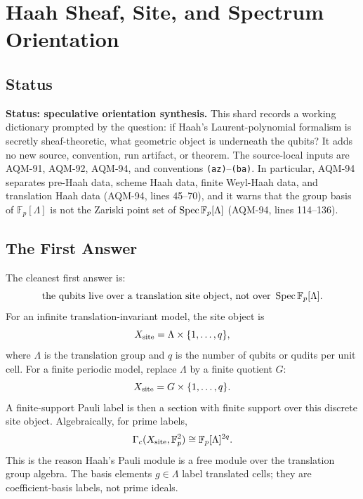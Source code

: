 
\section{Haah Sheaf, Site, and Spectrum Orientation}
\label{sec:haah-sheaf-site-spectrum-orientation}

\subsection{Status}

\textbf{Status: speculative orientation synthesis.}  This shard records a
working dictionary prompted by the question: if Haah's Laurent-polynomial
formalism is secretly sheaf-theoretic, what geometric object is underneath
the qubits?  It adds no new source, convention, run artifact, or theorem.  The
source-local inputs are AQM-91, AQM-92, AQM-94, and conventions
\texttt{(az)}--\texttt{(ba)}.  In particular, AQM-94 separates pre-Haah data,
scheme Haah data, finite Weyl-Haah data, and translation Haah data
(AQM-94, lines 45--70), and it warns that the group basis of
\(\mathbb F_p[\Lambda]\) is not the Zariski point set of
\(\operatorname{Spec}\mathbb F_p[\Lambda]\) (AQM-94, lines 114--136).

\subsection{The First Answer}

The cleanest first answer is:
\[
  \text{the qubits live over a translation site object, not over }
  \operatorname{Spec}\mathbb F_p[\Lambda].
\]
For an infinite translation-invariant model, the site object is
\[
  X_{\rm site}=\Lambda\times\{1,\ldots,q\},
\]
where \(\Lambda\) is the translation group and \(q\) is the number of
qubits or qudits per unit cell.  For a finite periodic model, replace
\(\Lambda\) by a finite quotient \(G\):
\[
  X_{\rm site}=G\times\{1,\ldots,q\}.
\]
A finite-support Pauli label is then a section with finite support over this
discrete site object.  Algebraically, for prime labels,
\[
  \Gamma_c(X_{\rm site},\mathbb F_p^{2})
  \cong \mathbb F_p[\Lambda]^{2q}.
\]
This is the reason Haah's Pauli module is a free module over the translation
group algebra.  The basis elements \(g\in\Lambda\) label translated cells; they
are coefficient-basis labels, not prime ideals.

